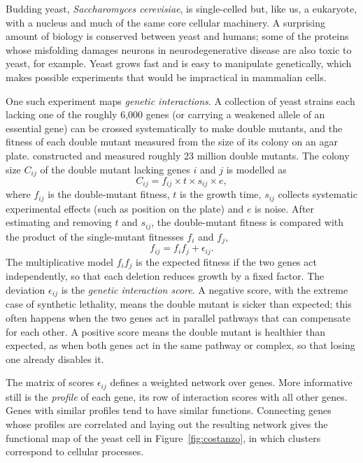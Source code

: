 Budding yeast, \textit{Saccharomyces cerevisiae}, is single-celled but, like us, a eukaryote, with a nucleus and much of the same core cellular machinery. A surprising amount of biology is conserved between yeast and humans; some of the proteins whose misfolding damages neurons in neurodegenerative disease are also toxic to yeast, for example. Yeast grows fast and is easy to manipulate genetically, which makes possible experiments that would be impractical in mammalian cells.

One such experiment maps \emph{genetic interactions}. A collection of yeast strains each lacking one of the roughly 6{,}000 genes (or carrying a weakened allele of an essential gene) can be crossed systematically to make double mutants, and the fitness of each double mutant measured from the size of its colony on an agar plate. \citet{costanzo2016} constructed and measured roughly 23 million double mutants. The colony size $C_{ij}$ of the double mutant lacking genes $i$ and $j$ is modelled as
\begin{equation}
  C_{ij} = f_{ij}\times t\times s_{ij}\times e,
\end{equation}
where $f_{ij}$ is the double-mutant fitness, $t$ is the growth time, $s_{ij}$ collects systematic experimental effects (such as position on the plate) and $e$ is noise. After estimating and removing $t$ and $s_{ij}$, the double-mutant fitness is compared with the product of the single-mutant fitnesses $f_i$ and $f_j$,
\begin{equation}
  f_{ij} = f_if_j + \epsilon_{ij}.
\end{equation}
The multiplicative model $f_if_j$ is the expected fitness if the two genes act independently, so that each deletion reduces growth by a fixed factor. The deviation $\epsilon_{ij}$ is the \emph{genetic interaction score}. A negative score, with the extreme case of synthetic lethality, means the double mutant is sicker than expected; this often happens when the two genes act in parallel pathways that can compensate for each other. A positive score means the double mutant is healthier than expected, as when both genes act in the same pathway or complex, so that losing one already disables it.

The matrix of scores $\epsilon_{ij}$ defines a weighted network over genes. More informative still is the \emph{profile} of each gene, its row of interaction scores with all other genes. Genes with similar profiles tend to have similar functions. Connecting genes whose profiles are correlated and laying out the resulting network gives the functional map of the yeast cell in Figure~\ref{fig:costanzo}, in which clusters correspond to cellular processes.

